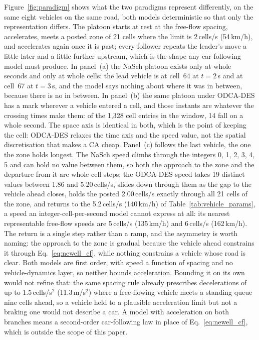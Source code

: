 \documentclass[review,number]{elsarticle}
\begin{document}
Figure~\ref{fig:paradigm} shows what the two paradigms represent differently, on the same eight vehicles on the same road, both models deterministic so that only the representation differs. The platoon starts at rest at the free-flow spacing, accelerates, meets a posted zone of 21 cells where the limit is 2\,cells/s (54\,km/h), and accelerates again once it is past; every follower repeats the leader's move a little later and a little further upstream, which is the shape any car-following model must produce. In panel~(a) the NaSch platoon exists only at whole seconds and only at whole cells: the lead vehicle is at cell~64 at $t = 2$\,s and at cell~67 at $t = 3$\,s, and the model says nothing about where it was in between, because there is no in between. In panel~(b) the same platoon under ODCA-DES has a mark wherever a vehicle entered a cell, and those instants are whatever the crossing times make them: of the 1{,}328 cell entries in the window, 14 fall on a whole second. The space axis is identical in both, which is the point of keeping the cell: ODCA-DES relaxes the time axis and the speed value, not the spatial discretisation that makes a CA cheap. Panel~(c) follows the last vehicle, the one the zone holds longest. The NaSch speed climbs through the integers 0, 1, 2, 3, 4, 5 and can hold no value between them, so both the approach to the zone and the departure from it are whole-cell steps; the ODCA-DES speed takes 19 distinct values between 1.86 and 5.20\,cells/s, slides down through them as the gap to the vehicle ahead closes, holds the posted 2.00\,cells/s exactly through all 21 cells of the zone, and returns to the 5.2\,cells/s (140\,km/h) of Table~\ref{tab:vehicle_params}, a speed an integer-cell-per-second model cannot express at all: its nearest representable free-flow speeds are 5\,cells/s (135\,km/h) and 6\,cells/s (162\,km/h). The return is a single step rather than a ramp, and the asymmetry is worth naming: the approach to the zone is gradual because the vehicle ahead constrains it through Eq.~\ref{eq:newell_cf}, while nothing constrains a vehicle whose road is clear. Both models are first order, with speed a function of spacing and no vehicle-dynamics layer, so neither bounds acceleration. Bounding it on its own would not refine that: the same spacing rule already prescribes decelerations of up to 1.5\,cells/s$^2$ (11.3\,m/s$^2$) where a free-flowing vehicle meets a standing queue nine cells ahead, so a vehicle held to a plausible acceleration limit but not a braking one would not describe a car. A model with acceleration on both branches means a second-order car-following law in place of Eq.~\ref{eq:newell_cf}, which is outside the scope of this paper.
\end{document}
